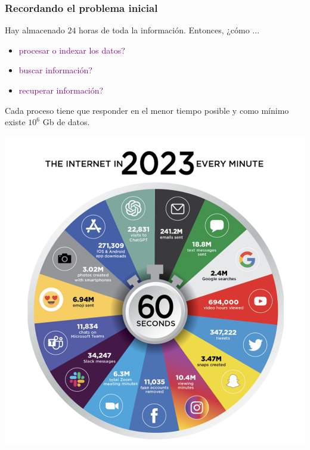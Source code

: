 \documentclass[
10pt, %
aspectratio=169, %
]{beamer}
\begin{document}
	\begin{frame}
		
		\frametitle{Recordando el problema inicial}
		
		\begin{minipage}{.4\textwidth}
			
			Hay almacenado $24$ horas de toda la información. Entonces,  ¿cómo ...
			\begin{itemize}
				
				\item \textcolor{purple}{procesar o indexar los datos?} 
				
				\item \textcolor{purple}{buscar información?} 
				
				\item \textcolor{purple}{recuperar información?} 
				
			\end{itemize}
			
			\vspace{1\baselineskip}
			
			Cada proceso tiene que responder en el menor tiempo posible y como mínimo existe $10^6$ Gb de datos.
			
		\end{minipage}%
		\begin{minipage}{.7\textwidth}
			
			\centering
			\includegraphics[scale=0.33]{infografia.png}
			
		\end{minipage}%
		
	\end{frame}
	
\end{document}
